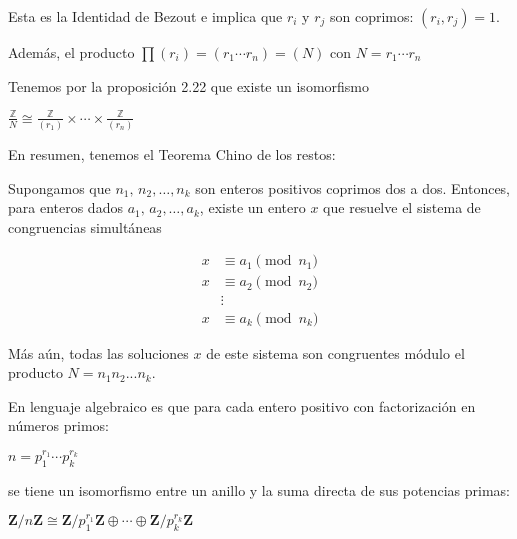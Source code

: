 \documentclass[10pt,a4paper]{article}
\begin{document}
	Esta es la Identidad de Bezout e implica que $r_i$ y $r_j$ son coprimos: $(r_i, r_j) =1 $.
	
	
	\hfil
	
	Además, el producto $\prod (r_i) = (r_1 \cdots r_n) = (N)$ con $N = r_1\cdots r_n$
	
	Tenemos por la proposición 2.22 que existe un isomorfismo 
	
	$\frac{\mathbb{Z}}{N} \cong  \frac{\mathbb{Z}}{(r_1)} \times \cdots \times \frac{\mathbb{Z}}{(r_n)}$
	
	\hfill 

 	En resumen, tenemos el Teorema Chino de los restos:
 	
 	\hfil 
 	
 	Supongamos que $n_1,\, n_2, …, n_k$
 	son enteros positivos coprimos dos a dos. Entonces, para enteros dados $a_1,\, a_2, …, a_k$, existe un
 	entero $x$ que resuelve el sistema de congruencias simultáneas
 	
 	\begin{align*}
 	x &\equiv a_1 \pmod{n_1} \\
 	x &\equiv a_2 \pmod{n_2} \\
 	&\vdots \\
 	x &\equiv a_k \pmod{n_k}
 	\end{align*}
 	
 	Más aún, todas las soluciones $x$ de este sistema son congruentes módulo el
 	producto $N = n_1 n_2 ... n_k$.
 	 	
 	En lenguaje algebraico es que para cada entero positivo con factorización en números primos:
 	
 	$n = p_1^{r_1}\cdots p_k^{r_k}$
 	
 	se tiene un isomorfismo entre un anillo y la suma directa de sus potencias primas:
 	
	$\mathbf{Z}/n\mathbf{Z} \cong \mathbf{Z}/p_1^{r_1}\mathbf{Z} \oplus \cdots \oplus \mathbf{Z}/p_k^{r_k}\mathbf{Z}$
 	
	
\end{document}
